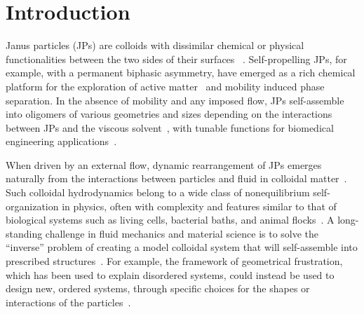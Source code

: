 \documentclass[prb,preprint,showpacs,preprintnumbers,amsmath,amssymb,longbibliography]{revtex4-2}
\begin{document}
\section{Introduction}
Janus particles (JPs) are colloids with dissimilar chemical or physical
functionalities between the two sides of their surfaces
~\cite{deGennes1992,KirillovaMarschelkeSynytska2019}. Self-propelling
JPs, for example, with a permanent biphasic asymmetry, have emerged as a
rich chemical platform for the exploration of active
matter~\cite{Meredithetal2022} and mobility induced phase separation.
In the absence of mobility and any imposed flow, JPs self-assemble into
oligomers of various geometries and sizes depending on the interactions
between JPs and the viscous solvent~\cite{Bradley2017, KangHonciuc2018,
HongCacciutoLuijtenGranick2008}, with tunable functions for biomedical
engineering applications~\cite{GheisariSahfieeAbbasiEtAl2021_DMR,
LiuYangHuangEtAl2016_Angew, LiWangYaoEtAl2019_Nanoscale,
Bradley2016,Zarzaretal2015, KirillovaMarschelkeSynytska2019}.

When driven by an external flow, dynamic rearrangement of JPs emerges
naturally from the interactions between particles and fluid in colloidal
matter~\cite{RevModPhys.93.025008}. Such colloidal hydrodynamics belong
to a wide class of nonequilibrium self-organization in physics, often
with complexity and features similar to that of biological systems such
as living cells, bacterial baths, and animal
flocks~\cite{CollardGrosjeanVandewalle2020, Vutukuri2020}. A
long-standing challenge in fluid mechanics and material science is to
solve the ``inverse'' problem of creating a model colloidal system that
will self-assemble into prescribed
structures~\cite{PhysRevLett.128.256102}. For example, the framework of
geometrical frustration, which has been used to explain disordered
systems, could instead be used to design new, ordered systems, through
specific choices for the shapes or interactions of the
particles~\cite{Manoharan2015_Science}.
\end{document}
